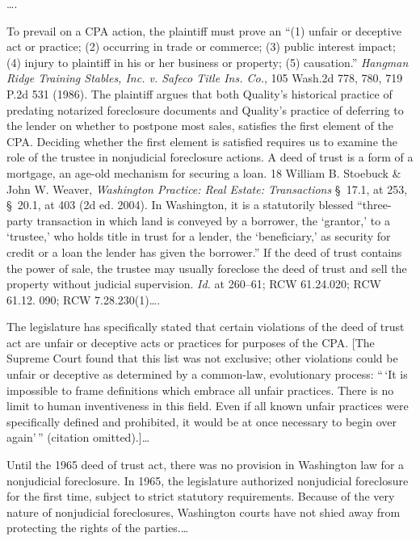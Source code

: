 
\ldots.


To prevail on a CPA action, the plaintiff must prove an ``(1) unfair or
deceptive act or practice; (2) occurring in trade or commerce; (3) public
interest impact; (4) injury to plaintiff in his or her business or property;
(5) causation.'' \emph{Hangman Ridge Training Stables, Inc. v. Safeco Title Ins.
Co.},
105 Wash.2d 778, 780, 719 P.2d 531 (1986). The plaintiff argues that both
Quality's historical practice of predating notarized foreclosure documents and
Quality's practice of deferring to the lender on whether to postpone most
sales, satisfies the first element of the CPA. Deciding whether the first
element is satisfied requires us to examine the role of the trustee in
nonjudicial foreclosure actions. A deed of trust is a form of a mortgage, an
age-old mechanism for securing a loan. 18 William B. Stoebuck \& John W.
Weaver, \emph{Washington Practice: Real Estate: Transactions} \S~17.1, at 253,
\S~20.1, at 403 (2d ed. 2004). In Washington, it is a statutorily blessed
``three-party transaction in which land is conveyed by a borrower, the
`grantor,' to a `trustee,' who holds title in trust for a lender, the
`beneficiary,' as security for credit or a loan the lender has given the
borrower.'' If the deed of trust contains the power of sale, the trustee may
usually foreclose the deed of trust and sell the property without judicial
supervision. \emph{Id.} at 260--61; RCW 61.24.020; RCW 61.12. 090; RCW
7.28.230(1)\dots.


The legislature has specifically stated that certain violations of the
deed of trust act are unfair or deceptive acts or practices for purposes of the
CPA. [The Supreme Court found that this list was not exclusive; other
violations could be unfair or deceptive as determined by a common-law,
evolutionary process: ``\,`It is impossible to frame definitions which embrace
all unfair practices. There is no limit to human inventiveness in this field.
Even if all known unfair practices were specifically defined and prohibited, it
would be at once necessary to begin over again'\,'' (citation omitted).]\dots 


Until the 1965 deed of trust act, there was no provision in Washington
law for a nonjudicial foreclosure. In 1965, the legislature authorized
nonjudicial foreclosure for the first time, subject to strict statutory
requirements. Because of the very nature of nonjudicial foreclosures,
Washington courts have not shied away from protecting the rights of the
parties.\dots 


